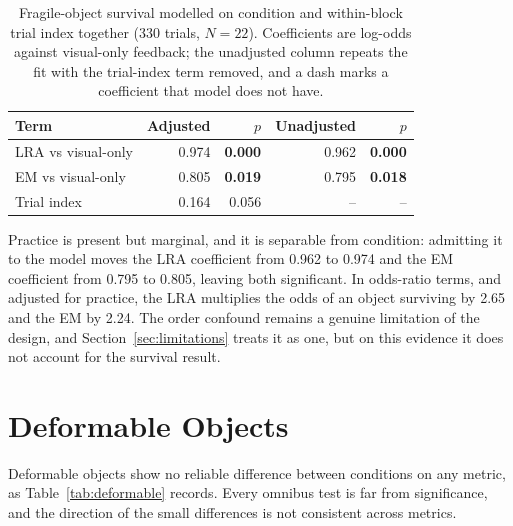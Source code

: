 \documentclass[12pt, a4paper, twoside, openright]{report}
\begin{document}
\begin{table}[ht]
    \centering
    \caption{Fragile-object survival modelled on condition and within-block
        trial index together (330 trials, $N=22$). Coefficients are log-odds
        against visual-only feedback; the unadjusted column repeats the fit
        with the trial-index term removed, and a dash marks a coefficient that
        model does not have.}
    \label{tab:gee}
    \begin{tabular}{@{}lrrrr@{}}
        \toprule
        Term               & Adjusted & $p$            & Unadjusted & $p$            \\
        \midrule
        LRA vs visual-only & 0.974    & \textbf{0.000} & 0.962      & \textbf{0.000} \\
        EM vs visual-only  & 0.805    & \textbf{0.019} & 0.795      & \textbf{0.018} \\
        Trial index        & 0.164    & 0.056          & --         & --             \\
        \bottomrule
    \end{tabular}
\end{table}

Practice is present but marginal, and it is separable from condition: admitting
it to the model moves the LRA coefficient from 0.962 to 0.974 and the EM
coefficient from 0.795 to 0.805, leaving both significant. In odds-ratio terms,
and adjusted for practice, the LRA multiplies the odds of an object surviving
by 2.65 and the EM by 2.24. The order confound remains a genuine limitation of
the design, and Section~\ref{sec:limitations} treats it as one, but on this
evidence it does not account for the survival result.

\section{Deformable Objects}
\label{sec:results-deformable}

Deformable objects show no reliable difference between conditions on any
metric, as Table~\ref{tab:deformable} records. Every omnibus test is far from
significance, and the direction of the small differences is not consistent
across metrics.
\end{document}
